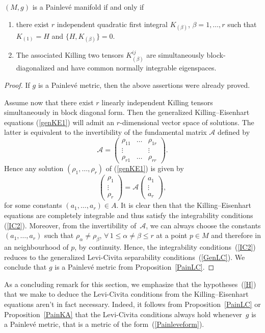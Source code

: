 \begin{Proposition} \label{PainKA}
$(M,g)$ is a Painlev\'e manifold if and only if
\begin{enumerate}\itemsep=0pt
\item[$1)$] there exist $r$ independent quadratic first integral $K_{(\beta)}$, $\beta = 1,\dots,r$ such that $K_{(1)} = H$ and $\{ H, K_{(\beta)} \} = 0$.
\item[$2)$] The associated Killing two tensors	$K_{(\beta)}^{ij}$ are simultaneously block-diagonalized and have common normally integrable eigenspaces.
\end{enumerate}
\end{Proposition}
\begin{proof}
If $g$ is a Painlev\'e metric, then the above assertions were already proved.

Assume now that there exist $r$ linearly independent Killing tensors simultaneously in block diagonal form. Then the generalized Killing--Eisenhart equations (\ref{genKE1}) will admit an $r$-dimen\-sio\-nal vector space of solutions. The latter is equivalent to the invertibility of the fundamental matrix $\mathcal{A}$ defined by
\[
{\mathcal{A}}=\left(
\begin{matrix}
\rho_{11}&\dots&\rho_{1r} \\
\vdots& & \vdots \\
\rho_{r1}&\dots&\rho_{rr}
\end{matrix}
\right).
\]
Hence any solution $(\rho_{1},\dots,\rho_{r})$ of (\ref{genKE1}) is given by
\[
\left(
\begin{matrix}\rho_{1}\\
\vdots\\
\rho_{r}
\end{matrix}
\right)
=
{\mathcal{A}}\left(
\begin{matrix}a_{1}\\
\vdots\\
a_{r}
\end{matrix}
\right),
\]
for some constants $(a_{1},\dots,a_{r})\in A$. It is clear then that the Killing--Eisenhart equations are completely integrable and thus satisfy the integrability conditions (\ref{IC2}). Moreover, from the invertibility of~$\mathcal{A}$, we can always choose the constants $(a_1,\dots,a_r)$ such that $\rho_{\alpha} \neq \rho_{\beta}$, $\forall\, 1 \leq \alpha \ne \beta \leq r$ at a point $p\in M$ and therefore in an neighbourhood of $p$, by continuity. Hence, the integrabi\-li\-ty conditions~(\ref{IC2}) reduces to the generalized Levi-Civita separability conditions~(\ref{GenLC}). We conclude that $g$ is a Painlev\'e metric from Proposition~\ref{PainLC}.
\end{proof}

As a concluding remark for this section, we emphasize that the hypotheses~(\ref{H}) that we make to deduce the Levi-Civita conditions from the Killing--Eisenhart equations aren't in fact necessary. Indeed, it follows from Proposition~\ref{PainLC} or Proposition~\ref{PainKA} that the Levi-Civita conditions always hold whenever~$g$ is a Painlev\'e metric, that is a metric of the form~(\ref{Painleveform}).

